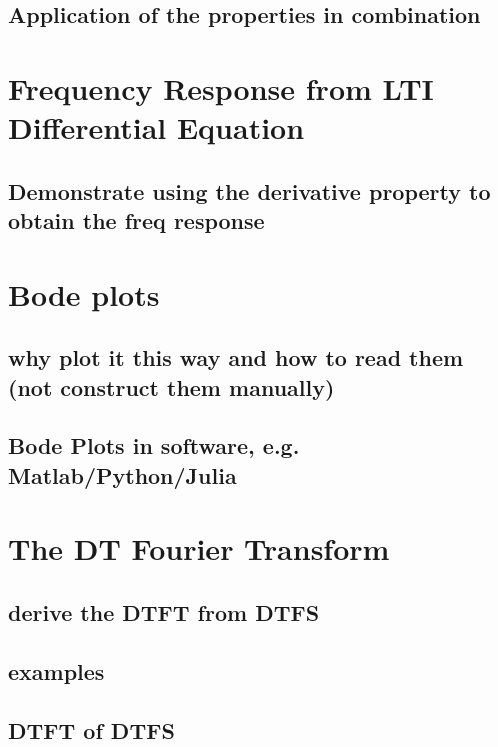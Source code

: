 \documentclass{article}
\begin{document}
\subsection{Application of the properties in combination}
\label{sec:orgdb2f8f1}

\section{Frequency Response from LTI Differential Equation}
\label{sec:org5067cc8}

\subsection{Demonstrate using the derivative property to obtain the freq response}
\label{sec:org1f03a18}

\section{Bode plots}
\label{sec:orgb48b8af}

\subsection{why plot it this way and how to read them (not construct them manually)}
\label{sec:org340c150}

\subsection{Bode Plots in software, e.g. Matlab/Python/Julia}
\label{sec:org379a762}

\section{The DT Fourier Transform}
\label{sec:org28dd76b}

\subsection{derive the DTFT from DTFS}
\label{sec:orge003b7a}

\subsection{examples}
\label{sec:orgc5187e0}

\subsection{DTFT of DTFS}
\label{sec:orgae5f02f}
\end{document}
